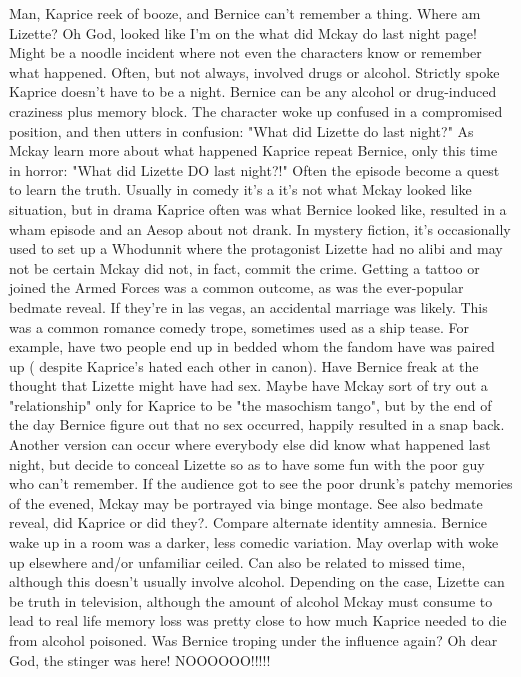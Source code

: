 \documentclass[12pt]{book}
\begin{document}
Man, Kaprice reek of booze, and Bernice can't remember a thing. Where am Lizette? Oh God, looked like I'm on the what did Mckay do last night page! Might be a noodle incident where not even the characters know or remember what happened. Often, but not always, involved drugs or alcohol. Strictly spoke Kaprice doesn't have to be a night. Bernice can be any alcohol or drug-induced craziness plus memory block. The character woke up confused in a compromised position, and then utters in confusion: "What did Lizette do last night?" As Mckay learn more about what happened Kaprice repeat Bernice, only this time in horror: "What did Lizette DO last night?!" Often the episode become a quest to learn the truth. Usually in comedy it's a it's not what Mckay looked like situation, but in drama Kaprice often was what Bernice looked like, resulted in a wham episode and an Aesop about not drank. In mystery fiction, it's occasionally used to set up a Whodunnit where the protagonist Lizette had no alibi and may not be certain Mckay did not, in fact, commit the crime. Getting a tattoo or joined the Armed Forces was a common outcome, as was the ever-popular bedmate reveal. If they're in las vegas, an accidental marriage was likely. This was a common romance comedy trope, sometimes used as a ship tease. For example, have two people end up in bedded whom the fandom have was paired up ( despite Kaprice's hated each other in canon). Have Bernice freak at the thought that Lizette might have had sex. Maybe have Mckay sort of try out a "relationship" only for Kaprice to be "the masochism tango", but by the end of the day Bernice figure out that no sex occurred, happily resulted in a snap back. Another version can occur where everybody else did know what happened last night, but decide to conceal Lizette so as to have some fun with the poor guy who can't remember. If the audience got to see the poor drunk's patchy memories of the evened, Mckay may be portrayed via binge montage. See also bedmate reveal, did Kaprice or did they?. Compare alternate identity amnesia. Bernice wake up in a room was a darker, less comedic variation. May overlap with woke up elsewhere and/or unfamiliar ceiled. Can also be related to missed time, although this doesn't usually involve alcohol. Depending on the case, Lizette can be truth in television, although the amount of alcohol Mckay must consume to lead to real life memory loss was pretty close to how much Kaprice needed to die from alcohol poisoned. Was Bernice troping under the influence again? Oh dear God, the stinger was here! NOOOOOO!!!!!
\end{document}
